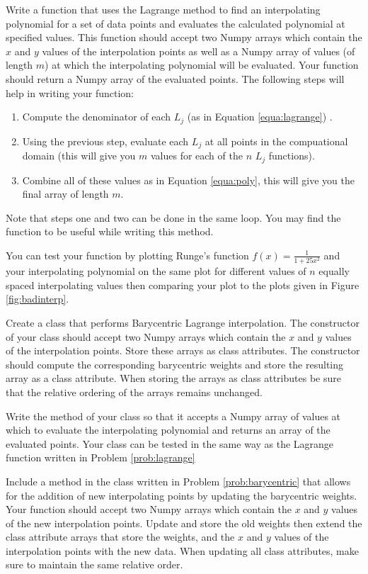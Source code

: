 
Write a function that uses the Lagrange method to find an interpolating polynomial for a set of data points and evaluates the calculated polynomial at specified values.
This function should accept two Numpy arrays which contain the $x$ and $y$ values of the interpolation points as well as a Numpy array of values (of length $m$) at which the interpolating polynomial 
will be evaluated.
Your function should return a Numpy array of the evaluated points.
The following steps will help in writing your function:
\begin{enumerate}
\item Compute the denominator of each $L_j$ (as in Equation \ref{equa:lagrange}) .
\item Using the previous step, evaluate each $L_j$ at all points in the compuational domain (this will give you $m$ values for each of the $n$ $L_j$ functions).
\item Combine all of these values as in Equation \ref{equa:poly}, this will give you the final array of length $m$.
\end{enumerate}
Note that steps one and two can be done in the same loop.
You may find the function  to be useful while writing this method.

You can test your function by plotting Runge's function $f(x)=\frac{1}{1+25x^2}$ and your interpolating polynomial on the same plot for different values of $n$ equally spaced interpolating values then comparing 
your plot to the plots given in Figure \ref{fig:badinterp}.
\label{prob:lagrange}

\label{prob:barycentric}
Create a class that performs Barycentric Lagrange interpolation.
The constructor of your class should accept two Numpy arrays which contain the $x$ and $y$ values of the interpolation points.
Store these arrays as class attributes.
The constructor should compute the corresponding barycentric weights and store the resulting array as a class attribute.
When storing the arrays as class attributes be sure that the relative ordering of the arrays remains unchanged.

Write the  method of your class so that it accepts a Numpy array of values at which to evaluate the interpolating polynomial and returns an array of the evaluated points.
Your class can be tested in the same way as the Lagrange function written in Problem \ref{prob:lagrange}

\label{prob:add weights}
Include a method in the class written in Problem \ref{prob:barycentric} that allows for the addition of new interpolating points by updating the barycentric weights.
Your function should accept two Numpy arrays which contain the $x$ and $y$ values of the new interpolation points.
Update and store the old weights then extend the class attribute arrays that store the weights, and the $x$ and $y$ values of the interpolation points with the new data.
When updating all class attributes, make sure to maintain the same relative order.

